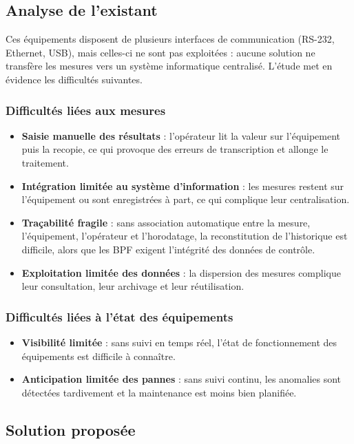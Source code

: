 \subsection{Analyse de l'existant}

Ces équipements disposent de plusieurs interfaces de communication (\ac{RS-232}, Ethernet, USB), mais celles-ci ne sont pas exploitées : aucune solution ne transfère les mesures vers un système informatique centralisé. L'étude met en évidence les difficultés suivantes.

\subsubsection*{Difficultés liées aux mesures}
\begin{itemize}
    \item \textbf{Saisie manuelle des résultats} : l'opérateur lit la valeur sur l'équipement puis la recopie, ce qui provoque des erreurs de transcription et allonge le traitement.
    \item \textbf{Intégration limitée au système d'information} : les mesures restent sur l'équipement ou sont enregistrées à part, ce qui complique leur centralisation.
    \item \textbf{Traçabilité fragile} : sans association automatique entre la mesure, l'équipement, l'opérateur et l'horodatage, la reconstitution de l'historique est difficile, alors que les \ac{BPF} exigent l'intégrité des données de contrôle.
    \item \textbf{Exploitation limitée des données} : la dispersion des mesures complique leur consultation, leur archivage et leur réutilisation.
\end{itemize}

\subsubsection*{Difficultés liées à l'état des équipements}
\begin{itemize}
    \item \textbf{Visibilité limitée} : sans suivi en temps réel, l'état de fonctionnement des équipements est difficile à connaître.
    \item \textbf{Anticipation limitée des pannes} : sans suivi continu, les anomalies sont détectées tardivement et la maintenance est moins bien planifiée.
\end{itemize}

\subsection{Solution proposée}

